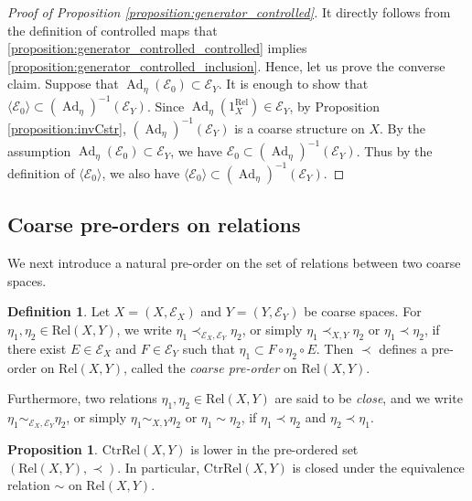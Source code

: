 \documentclass[12pt, a4paper]{amsart}
\theoremstyle{definition}
\newtheorem{proposition}[theorem]{Proposition}
\newtheorem{definition}[theorem]{Definition}
\newcommand{\Ad}{\mathop{\mathrm{Ad}}\nolimits}
\newcommand{\Rel}{\mathrm{Rel}}
\newcommand{\CtrRel}{\mathrm{CtrRel}}
\begin{document}
\begin{proof}[Proof of Proposition \ref{proposition:generator_controlled}]
It directly follows from the definition of controlled maps that \eqref{proposition:generator_controlled_controlled} implies \eqref{proposition:generator_controlled_inclusion}.
Hence, let us prove the converse claim.
Suppose that $\Ad_{\eta}(\mathcal{E}_0) \subset \mathcal{E}_Y$. It is enough to show that $\langle \mathcal{E}_0 \rangle \subset (\Ad_\eta)^{-1}(\mathcal{E}_Y)$.
Since $\Ad_\eta(1^\Rel_X) \in \mathcal{E}_Y$, 
by Proposition \ref{proposition:invCstr},   
$(\Ad_\eta)^{-1}(\mathcal{E}_Y)$ is a coarse structure on $X$.
By the assumption $\Ad_{\eta}(\mathcal{E}_0) \subset \mathcal{E}_Y$, we have $\mathcal{E}_0 \subset (\Ad_\eta)^{-1}(\mathcal{E}_Y)$.
Thus by the definition of $\langle \mathcal{E}_0 \rangle$, 
we also have $\langle \mathcal{E}_0 \rangle \subset (\Ad_\eta)^{-1}(\mathcal{E}_Y)$.
\end{proof}

\subsection{Coarse pre-orders on relations}

We next introduce a natural pre-order on the set of relations between two
coarse spaces.

\begin{definition}\label{definition:close_ctrrel}
Let $X=(X,\mathcal{E}_X)$ and $Y=(Y,\mathcal{E}_Y)$ be coarse spaces.
For $\eta_1,\eta_2\in\Rel(X,Y)$, we write
$\eta_1\prec_{\mathcal{E}_X,\mathcal{E}_Y}\eta_2$,
or simply
$\eta_1\prec_{X,Y}\eta_2$ or $\eta_1\prec\eta_2$,
if there exist
$E\in\mathcal{E}_X$ and $F\in\mathcal{E}_Y$ such that
$\eta_1\subset F\circ\eta_2\circ E$.
Then $\prec$ defines a pre-order on $\Rel(X,Y)$, called the
\emph{coarse pre-order} on $\Rel(X,Y)$.

Furthermore, two relations
$\eta_1,\eta_2\in\Rel(X,Y)$
are said to be \emph{close}, and we write
$\eta_1\sim_{\mathcal{E}_X,\mathcal{E}_Y}\eta_2$,
or simply
$\eta_1\sim_{X,Y}\eta_2$ or $\eta_1\sim\eta_2$,
if
$\eta_1\prec\eta_2$
and
$\eta_2\prec\eta_1$.
\end{definition}

\begin{proposition}\label{proposition:CtrLowerprec}
$\CtrRel(X,Y)$ is lower in the pre-ordered set
$(\Rel(X,Y),\prec)$.
In particular, $\CtrRel(X,Y)$ is closed under the equivalence relation
$\sim$ on $\Rel(X,Y)$.
\end{proposition}
\end{document}
